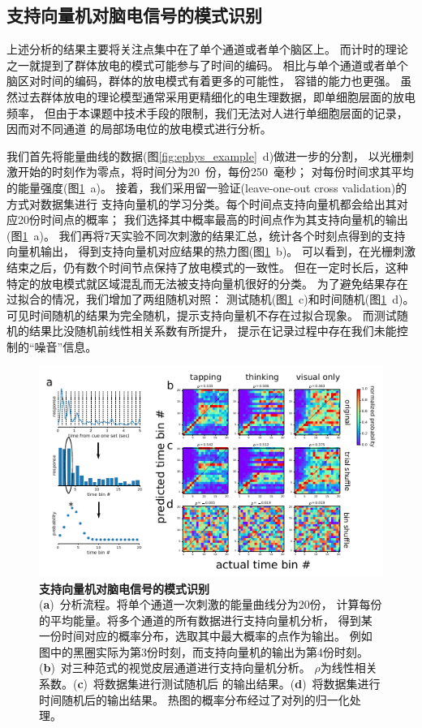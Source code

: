 \subsection{支持向量机对脑电信号的模式识别}
上述分析的结果主要将关注点集中在了单个通道或者单个脑区上。
而计时的理论之一就提到了群体放电的模式可能参与了时间的编码\cite{remington2018dynamical}。
相比与单个通道或者单个脑区对时间的编码，群体的放电模式有着更多的可能性，
容错的能力也更强。
虽然过去群体放电的理论模型通常采用更精细化的电生理数据，即单细胞层面的放电频率，
但由于本课题中技术手段的限制，我们无法对人进行单细胞层面的记录，因而对不同通道
的局部场电位的放电模式进行分析。

我们首先将能量曲线的数据(图\ref{fig:ephys_example}~d)做进一步的分割，
以光栅刺激开始的时刻作为零点，将时间分为20~份，每份250~毫秒；
对每份时间求其平均的能量强度(图\ref{fig:svm}~a)。
接着，我们采用留一验证(leave-one-out cross validation)的方式对数据集进行
支持向量机的学习分类。每个时间点支持向量机都会给出其对应20份时间点的概率；
我们选择其中概率最高的时间点作为其支持向量机的输出(图\ref{fig:svm}~a)。
我们再将7天实验不同次刺激的结果汇总，统计各个时刻点得到的支持向量机输出，
得到支持向量机对应结果的热力图(图\ref{fig:svm}~b)。
可以看到，在光栅刺激结束之后，仍有数个时间节点保持了放电模式的一致性。
但在一定时长后，这种特定的放电模式就区域混乱而无法被支持向量机很好的分类。
为了避免结果存在过拟合的情况，我们增加了两组随机对照：
测试随机(图\ref{fig:svm}~c)和时间随机(图\ref{fig:svm}~d)。
可见时间随机的结果为完全随机，提示支持向量机不存在过拟合现象。
而测试随机的结果比没随机前线性相关系数有所提升，
提示在记录过程中存在我们未能控制的“噪音”信息。

\begin{figure}[h]
    \centering
    \includegraphics[width=\textwidth]{src/figures/svm.pdf}
    \caption{\textbf{支持向量机对脑电信号的模式识别}\\
    (\textbf{a})~分析流程。将单个通道一次刺激的能量曲线分为20份，
    计算每份的平均能量。将多个通道的所有数据进行支持向量机分析，
    得到某一份时间对应的概率分布，选取其中最大概率的点作为输出。
    例如图中的黑圈实际为第3份时刻，而支持向量机的输出为第4份时刻。
    (\textbf{b})~对三种范式的视觉皮层通道进行支持向量机分析。
    \(\rho\)为线性相关系数。(\textbf{c})~将数据集进行测试随机后
    的输出结果。(\textbf{d})~将数据集进行时间随机后的输出结果。
    热图的概率分布经过了对列的归一化处理。}
    \label{fig:svm}
\end{figure}

